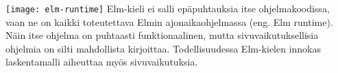 \texttt{[image: elm-runtime]}
Elm-kieli ei salli epäpuhtauksia itse ohjelmakoodissa, vaan ne on kaikki toteutettava Elmin ajonaikaohjelmassa (eng. Elm
runtime). Näin itse ohjelma on puhtaasti funktionaalinen, mutta sivuvaikutuksellisia ohjelmia on silti mahdollista
kirjoittaa. Todellisuudessa Elm-kielen innokas laskentamalli aiheuttaa myös sivuvaikutuksia. \cite{elmlang}

